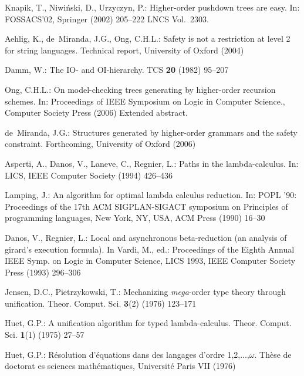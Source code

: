 \documentclass{llncs}
\begin{document}

\begin{thebibliography}{10}
Knapik, T., Niwi{\'n}ski, D., Urzyczyn, P.:
\newblock Higher-order pushdown trees are easy.
\newblock In: FOSSACS'02, Springer (2002)  205--222 LNCS Vol.~2303.

Aehlig, K., de~Miranda, J.G., Ong, C.H.L.:
\newblock Safety is not a restriction at level 2 for string languages.
\newblock Technical report, University of Oxford (2004)

Damm, W.:
\newblock The {IO-} and {OI}-hierarchy.
\newblock TCS \textbf{20} (1982)  95--207

Ong, C.H.L.:
\newblock On model-checking trees generating by higher-order recursion schemes.
\newblock In: Proceedings of IEEE Symposium on Logic in Computer Science.,
  Computer Society Press (2006) Extended abstract.

de~Miranda, J.G.:
\newblock Structures generated by higher-order grammars and the safety
  constraint.
\newblock Forthcoming, University of Oxford (2006)

Asperti, A., Danos, V., Laneve, C., Regnier, L.:
\newblock Paths in the lambda-calculus.
\newblock In: LICS, IEEE Computer Society (1994)  426--436

Lamping, J.:
\newblock An algorithm for optimal lambda calculus reduction.
\newblock In: POPL '90: Proceedings of the 17th ACM SIGPLAN-SIGACT symposium on
  Principles of programming languages, New York, NY, USA, ACM Press (1990)
  16--30

Danos, V., Regnier, L.:
\newblock Local and asynchronous beta-reduction (an analysis of girard's
  execution formula).
\newblock In Vardi, M., ed.: Proceedings of the Eighth Annual IEEE Symp. on
  Logic in Computer Science, {LICS} 1993, IEEE Computer Society Press (1993)
  296--306

Jensen, D.C., Pietrzykowski, T.:
\newblock Mechanizing {\it mega}-order type theory through unification.
\newblock Theor. Comput. Sci. \textbf{3}(2) (1976)  123--171

Huet, G.P.:
\newblock A unification algorithm for typed lambda-calculus.
\newblock Theor. Comput. Sci. \textbf{1}(1) (1975)  27--57

Huet, G.P.:
\newblock R{\'e}solution d'{\'e}quations dans des langages d'ordre
  1,2,...,$\omega$.
\newblock Th{\`e}se de doctorat es sciences math{\'e}matiques, Universit{\'e}
  Paris VII (1976)


\end{thebibliography}
\end{document}
